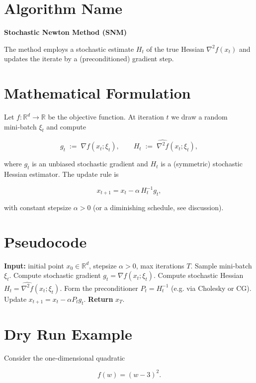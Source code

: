 \documentclass{article}
\newcommand{\R}{\mathbb{R}}
\newcommand{\grad}{\nabla}
\begin{document}
\section*{Algorithm Name}
\textbf{Stochastic Newton Method (SNM)}  

The method employs a stochastic estimate $H_t$ of the true Hessian $\nabla^2 f(x_t)$ and updates the iterate by a (preconditioned) gradient step.

\section*{Mathematical Formulation}
Let $f:\R^d\rightarrow\R$ be the objective function. At iteration $t$ we draw a random mini‑batch $\xi_t$ and compute  

\[
g_t \;:=\; \grad f(x_t;\xi_t) ,\qquad   
H_t \;:=\; \widehat{\nabla^2 f}(x_t;\xi_t),
\]

where $g_t$ is an unbiased stochastic gradient and $H_t$ is a (symmetric) stochastic Hessian estimator.  
The update rule is  

\[
\boxed{
x_{t+1}=x_t-\alpha\, H_t^{-1} g_t},
\tag{1}
\]

with constant stepsize $\alpha>0$ (or a diminishing schedule, see discussion).  

\section*{Pseudocode}
\begin{algorithm}[H]
\caption{Stochastic Newton Method}
\begin{algorithmic}[1]
\STATE \textbf{Input:} initial point $x_0\in\R^d$, stepsize $\alpha>0$, max iterations $T$.
    \STATE Sample mini‑batch $\xi_t$.
    \STATE Compute stochastic gradient $g_t=\grad f(x_t;\xi_t)$.
    \STATE Compute stochastic Hessian $H_t=\widehat{\nabla^2 f}(x_t;\xi_t)$.
    \STATE Form the preconditioner $P_t=H_t^{-1}$ (e.g. via Cholesky or CG).
    \STATE Update $x_{t+1}=x_t-\alpha P_t g_t$.
\ENDFOR
\STATE \textbf{Return} $x_T$.
\end{algorithmic}
\end{algorithm}

\section*{Dry Run Example}
Consider the one‑dimensional quadratic  

\[
f(w)=(w-3)^2 .
\]
\end{document}
